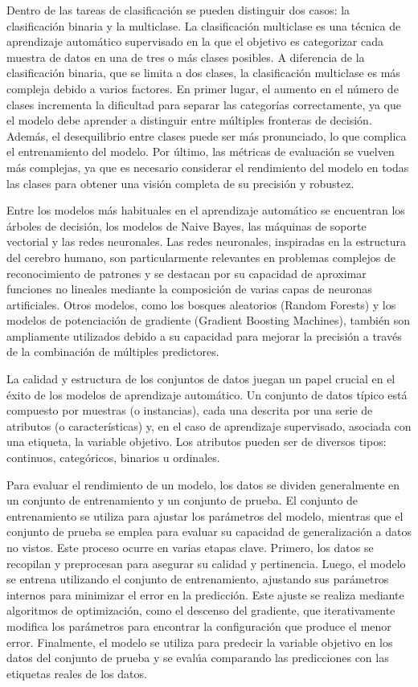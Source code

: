 Dentro de las tareas de clasificación se pueden distinguir dos casos: la clasificación binaria y la multiclase. La clasificación multiclase es una técnica de aprendizaje automático supervisado en la que el objetivo es categorizar cada muestra de datos en una de tres o más clases posibles. A diferencia de la clasificación binaria, que se limita a dos clases, la clasificación multiclase es más compleja debido a varios factores. En primer lugar, el aumento en el número de clases incrementa la dificultad para separar las categorías correctamente, ya que el modelo debe aprender a distinguir entre múltiples fronteras de decisión. Además, el desequilibrio entre clases puede ser más pronunciado, lo que complica el entrenamiento del modelo. Por último, las métricas de evaluación se vuelven más complejas, ya que es necesario considerar el rendimiento del modelo en todas las clases para obtener una visión completa de su precisión y robustez. 

Entre los modelos más habituales en el aprendizaje automático se encuentran los árboles de decisión, los modelos de Naive Bayes, las máquinas de soporte vectorial y las redes neuronales. Las redes neuronales, inspiradas en la estructura del cerebro humano, son particularmente relevantes en problemas complejos de reconocimiento de patrones y se destacan por su capacidad de aproximar funciones no lineales mediante la composición de varias capas de neuronas artificiales. Otros modelos, como los bosques aleatorios (Random Forests) y los modelos de potenciación de gradiente (Gradient Boosting Machines), también son ampliamente utilizados debido a su capacidad para mejorar la precisión a través de la combinación de múltiples predictores.

La calidad y estructura de los conjuntos de datos juegan un papel crucial en el éxito de los modelos de aprendizaje automático. Un conjunto de datos típico está compuesto por muestras (o instancias), cada una descrita por una serie de atributos (o características) y, en el caso de aprendizaje supervisado, asociada con una etiqueta, la variable objetivo. Los atributos pueden ser de diversos tipos: continuos, categóricos, binarios u ordinales.

Para evaluar el rendimiento de un modelo, los datos se dividen generalmente en un conjunto de entrenamiento y un conjunto de prueba. El conjunto de entrenamiento se utiliza para ajustar los parámetros del modelo, mientras que el conjunto de prueba se emplea para evaluar su capacidad de generalización a datos no vistos. Este proceso ocurre en varias etapas clave. Primero, los datos se recopilan y preprocesan para asegurar su calidad y pertinencia. Luego, el modelo se entrena utilizando el conjunto de entrenamiento, ajustando sus parámetros internos para minimizar el error en la predicción. Este ajuste se realiza mediante algoritmos de optimización, como el descenso del gradiente, que iterativamente modifica los parámetros para encontrar la configuración que produce el menor error. Finalmente, el modelo se utiliza para predecir la variable objetivo en los datos del conjunto de prueba y se evalúa comparando las predicciones con las etiquetas reales de los datos.

